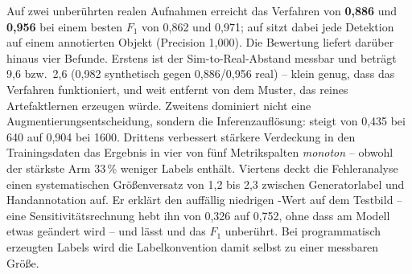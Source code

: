 Auf zwei unberührten realen Aufnahmen erreicht das Verfahren \mAPfifty{} von
\textbf{0,886} und \textbf{0,956} bei einem besten $F_1$ von 0,862 und 0,971;
auf  sitzt dabei jede Detektion auf einem annotierten Objekt
(Precision 1,000). Die Bewertung liefert darüber hinaus vier Befunde. Erstens ist
der Sim-to-Real-Abstand messbar und beträgt 9,6 bzw.\ 2,6\PP{} \mAPfifty{}
(0,982 synthetisch gegen 0,886/0,956 real) -- klein genug, dass das Verfahren
funktioniert, und weit entfernt von dem Muster, das reines Artefaktlernen
erzeugen würde. Zweitens dominiert nicht eine
Augmentierungsentscheidung, sondern die Inferenzauflösung: \mAPfifty{} steigt von
0,435 bei 640\px{} auf 0,904 bei 1600\px. Drittens verbessert stärkere
Verdeckung in den Trainingsdaten das Ergebnis in vier von fünf Metrikspalten
\emph{monoton} -- obwohl der stärkste Arm 33\,\% weniger Labels enthält.
Viertens deckt die Fehleranalyse einen systematischen Größenversatz von 1,2 bis
2,3\px{} zwischen Generatorlabel und Handannotation auf. Er erklärt den auffällig
niedrigen \mAPseven{}-Wert auf dem Testbild -- eine Sensitivitätsrechnung hebt
ihn von 0,326 auf 0,752, ohne dass am Modell etwas geändert wird -- und lässt
\mAPfifty{} und das $F_1$ unberührt. Bei programmatisch erzeugten
Labels wird die Labelkonvention damit selbst zu einer messbaren Größe.

